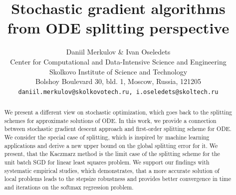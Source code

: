 \documentclass{article}
\begin{document}
\title{Stochastic gradient algorithms from ODE splitting perspective}

\author{Daniil Merkulov \& Ivan Oseledets \\
Center for Computational and Data-Intensive Science and Engineering\\
Skolkovo Institute of Science and Technology\\
Bolshoy Boulevard 30, bld. 1, Moscow, Russia, 121205 \\
\texttt{daniil.merkulov@skolkovotech.ru, i.oseledets@skoltech.ru}
}

\maketitle


\begin{abstract}
We present a different view on stochastic optimization, which goes back to the splitting schemes for approximate solutions of ODE. In this work, we provide a connection between stochastic gradient descent approach and first-order splitting scheme for ODE. We consider the special case of splitting, which is inspired by machine learning applications and derive a new upper bound on the global splitting error for it. We present, that the Kaczmarz method is the limit case of the splitting scheme for the unit batch SGD for linear least squares problem. We support our findings with systematic empirical studies, which demonstrates, that a more accurate solution of local problems leads to the stepsize robustness and provides better convergence in time and iterations on the softmax regression problem.
\end{abstract}
\end{document}
